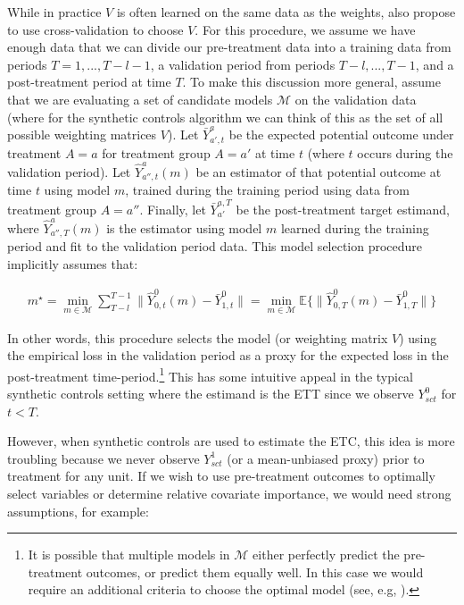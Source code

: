 While in practice $V$ is often learned on the same data as the weights, \cite{abadie2010synthetic} also propose to use cross-validation to choose $V$. For this procedure, we assume we have enough data that we can divide our pre-treatment data into a training data from periods $T = 1, ..., T - l - 1$, a validation period from periods $T - l, ..., T - 1$, and a post-treatment period at time $T$. To make this discussion more general, assume that we are evaluating a set of candidate models $\mathcal{M}$ on the validation data (where for the synthetic controls algorithm we can think of this as the set of all possible weighting matrices $V$). Let $\bar{Y}^a_{a', t}$ be the expected potential outcome under treatment $A = a$ for treatment group $A = a'$ at time $t$ (where $t$ occurs during the validation period). Let $\hat{Y}^a_{a'', t}(m)$ be an estimator of that potential outcome at time $t$ using model $m$, trained during the training period using data from treatment group $A = a''$. Finally, let $\bar{Y}_{a'}^{a, T}$ be the post-treatment target estimand, where $\hat{Y}^a_{a'', T}(m)$ is the estimator using model $m$ learned during the training period and fit to the validation period data. This model selection procedure implicitly assumes that:

\begin{align*}
m^\star = \min_{m \in \mathcal{M}}\sum_{T - l}^{T-1}\|\hat{Y}^0_{0, t}(m) - \bar{Y}^0_{1, t}\| = \min_{m \in \mathcal{M}}\mathbb{E}\{\|\hat{Y}^0_{0, T}(m) - \bar{Y}^0_{1, T}\|\}
\end{align*}

In other words, this procedure selects the model (or weighting matrix $V$) using the empirical loss in the validation period as a proxy for the expected loss in the post-treatment time-period.\footnote{It is possible that multiple models in $\mathcal{M}$ either perfectly predict the pre-treatment outcomes, or predict them equally well. In this case we would require an additional criteria to choose the optimal model (see, e.g, \cite{becker2017cross}).} This has some intuitive appeal in the typical synthetic controls setting where the estimand is the ETT since we observe $Y^0_{sct}$ for $t < T$. 

However, when synthetic controls are used to estimate the ETC, this idea is more troubling because we never observe $Y^1_{sct}$ (or a mean-unbiased proxy) prior to treatment for any unit. If we wish to use pre-treatment outcomes to optimally select variables or determine relative covariate importance, we would need strong assumptions, for example:

